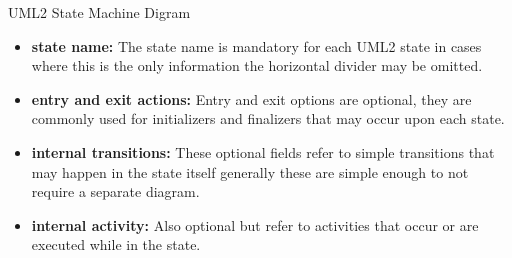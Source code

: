 \begin{definition}
UML2 State Machine Digram

\label{def:uml2}
\begin{itemize}
	\item \textbf{state name:} The state name is mandatory for each UML2 state in cases where this is the only information the horizontal divider may be omitted.
	\item \textbf{entry and exit actions:} Entry and exit options are optional, they are commonly used for initializers and finalizers that may occur upon each state.
	\item \textbf{internal transitions:} These optional fields refer to simple transitions that may happen in the state itself generally these are simple enough to not require a separate diagram.
	\item \textbf{internal activity:} Also optional but refer to activities that occur or are executed while in the state.
\end{itemize}
\end{definition}


